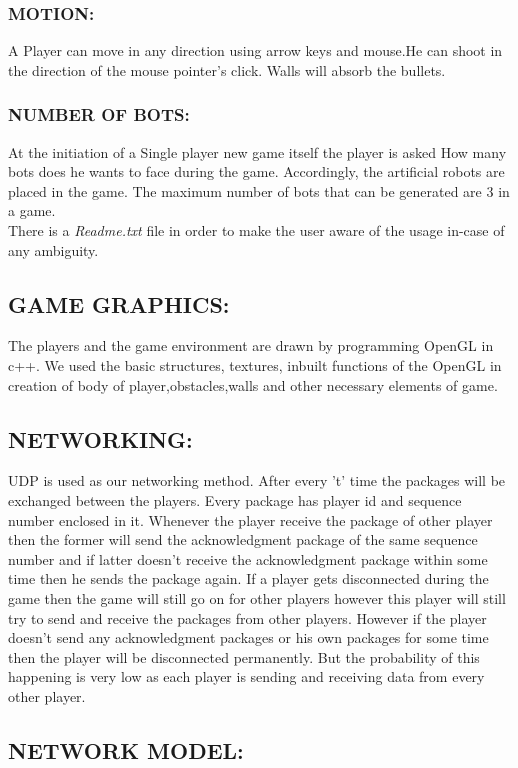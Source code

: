 \documentclass[10pt]{article}
\begin{document}
    \subsubsection{MOTION:}
    A Player can move in any direction using arrow keys and mouse.He can shoot in the direction of the mouse pointer's click. Walls will absorb the bullets.
	\subsubsection{NUMBER OF BOTS:}		
  At the initiation of a Single player new game itself the player is asked How many bots does he wants to face during the game. Accordingly, the artificial robots are placed in the game. The maximum number of bots that can be generated are 3 in a game.\\
There is a \emph{Readme.txt} file in order to make the user aware of the usage in-case of any ambiguity.
\subsection{GAME GRAPHICS:}
    The players and the game environment are drawn by programming OpenGL in c++. We used the basic structures, textures, inbuilt functions of the OpenGL in creation of body of player,obstacles,walls and other necessary elements of game.

\subsection{NETWORKING:}
UDP is used as our networking method.
After every 't' time the packages will be exchanged between the players.
Every package has player id and sequence number enclosed in it.
Whenever the player receive the package of other player then the former will send the acknowledgment package of the same sequence number  and if latter doesn’t receive the acknowledgment package within some time then he sends the package again.
If a player gets disconnected during the game then the game will still go on for other players however this player will still try to send and receive the packages from other players. However if the player doesn't send any acknowledgment packages or his own packages for some time then the player will be disconnected permanently. But the probability of this happening is very low as each player is sending and receiving data from every other player.
\\

\subsection*{ NETWORK MODEL:}
\end{document}
